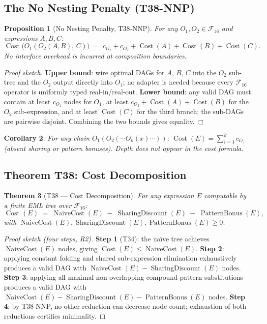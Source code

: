 \documentclass[12pt,a4paper]{article}
\newtheorem{theorem}{Theorem}[section]
\newtheorem{corollary}[theorem]{Corollary}
\newtheorem{proposition}[theorem]{Proposition}
\theoremstyle{definition}
\newcommand{\Cost}{\operatorname{Cost}}
\newcommand{\NC}{\operatorname{NaiveCost}}
\newcommand{\SD}{\operatorname{SharingDiscount}}
\newcommand{\PB}{\operatorname{PatternBonus}}
\begin{document}
\subsection{The No Nesting Penalty (T38-NNP)}

\begin{proposition}[No Nesting Penalty, T38-NNP]
\label{prop:NNP}
For any $O_1, O_2 \in \mathcal{F}_{16}$ and expressions $A, B, C$:
\[
  \Cost\!\bigl(O_1(O_2(A,B),\,C)\bigr)
  \;=\;
  c_{O_1} + c_{O_2} + \Cost(A) + \Cost(B) + \Cost(C).
\]
No interface overhead is incurred at composition boundaries.
\end{proposition}

\begin{proof}[Proof sketch]
\textbf{Upper bound}: wire optimal DAGs for $A$, $B$, $C$ into the $O_2$
sub-tree and the $O_2$ output directly into $O_1$; no adapter is needed
because every $\mathcal{F}_{16}$ operator is uniformly typed real-in/real-out.
\textbf{Lower bound}: any valid DAG must contain at least $c_{O_1}$ nodes for
$O_1$, at least $c_{O_2}+\Cost(A)+\Cost(B)$ for the $O_2$ sub-expression, and
at least $\Cost(C)$ for the third branch; the sub-DAGs are pairwise disjoint.
Combining the two bounds gives equality.
\end{proof}

\begin{corollary}
For any chain $O_1(O_2(\cdots O_k(x)\cdots))$: $\Cost(E) = \sum_{i=1}^{k} c_{O_i}$ (absent sharing or pattern bonuses).
Depth does not appear in the cost formula.
\end{corollary}

\subsection{Theorem T38: Cost Decomposition}

\begin{theorem}[T38 --- Cost Decomposition]
\label{thm:T38}
For any expression $E$ computable by a finite EML tree over $\mathcal{F}_{16}$:
\[
  \boxed{\Cost(E) \;=\; \NC(E) \;-\; \SD(E) \;-\; \PB(E),}
\]
with $\NC(E), \SD(E), \PB(E) \geq 0$.
\end{theorem}

\begin{proof}[Proof sketch (four steps, R2)]
\textbf{Step 1} (T34): the na\"{i}ve tree achieves $\NC(E)$ nodes, giving
$\Cost(E) \leq \NC(E)$.
\textbf{Step 2}: applying constant folding and shared sub-expression
elimination exhaustively produces a valid DAG with $\NC(E)-\SD(E)$ nodes.
\textbf{Step 3}: applying all maximal non-overlapping compound-pattern
substitutions produces a valid DAG with $\NC(E)-\SD(E)-\PB(E)$ nodes.
\textbf{Step 4}: by T38-NNP, no other reduction can decrease node count;
exhaustion of both reductions certifies minimality.
\end{proof}
\end{document}
